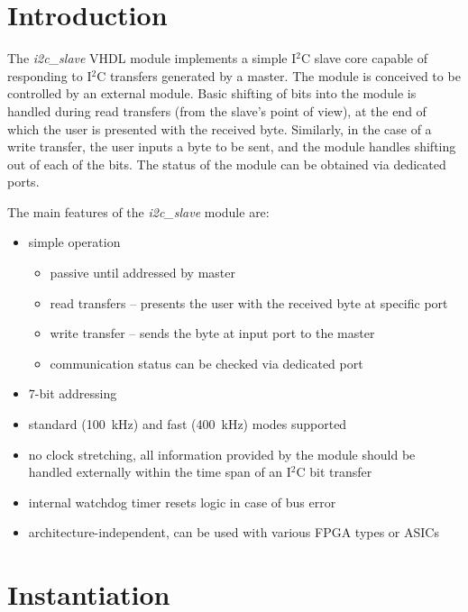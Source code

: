 \documentclass[a4paper,11pt]{article}
\begin{document}
\section{Introduction}
\label{sec:intro}

The \textit{i2c\_slave} VHDL module implements a simple I$^2$C 
slave core capable of responding to I$^2$C transfers generated by a master. The module 
is conceived to be controlled by an external module. Basic shifting of bits into the 
module is handled during read transfers (from the slave's point of view), at the end of 
which the user is presented with the received byte. Similarly, in the case of a write 
transfer, the user inputs a byte to be sent, and the module handles shifting out of each 
of the bits. The status of the module can be obtained via dedicated ports.

The main features of the \textit{i2c\_slave} module are:
\begin{itemize}
  \item simple operation
  \begin{itemize}
    \item passive until addressed by master
    \item read transfers -- presents the user with the received byte at specific port
    \item write transfer -- sends the byte at input port to the master
    \item communication status can be checked via dedicated port
  \end{itemize}
  \item 7-bit addressing
  \item standard (100~kHz) and fast (400~kHz) modes supported
  \item no clock stretching, all information provided by the module should be handled
  externally within the time span of an I$^2$C bit transfer
  \item internal watchdog timer resets logic in case of bus error
  \item architecture-independent, can be used with various FPGA types or ASICs
\end{itemize}

\section{Instantiation}
\label{sec:instantiation}
\end{document}
